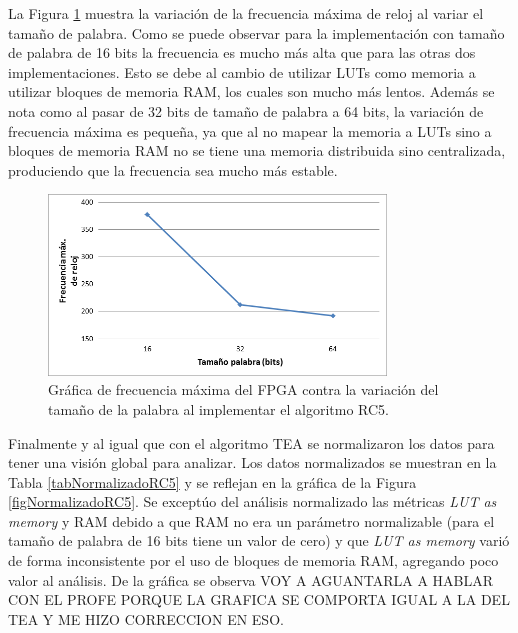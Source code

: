 La Figura \ref{figFrecuenciasRC5} muestra la variación de la frecuencia máxima de reloj al variar el tamaño de palabra. Como se puede observar para la implementación con tamaño de palabra de 16 bits la frecuencia es mucho más alta que para las otras dos implementaciones. Esto se debe al cambio de utilizar LUTs como memoria a utilizar bloques de memoria RAM, los cuales son mucho más lentos. Además se nota como al pasar de 32 bits de tamaño de palabra a 64 bits, la variación de frecuencia máxima es pequeña, ya que al no mapear la memoria a LUTs sino a bloques de memoria RAM no se tiene una memoria distribuida sino centralizada, produciendo que la frecuencia sea mucho más estable.
\begin{figure}[H]
	\centering
	\includegraphics[width=0.8\textwidth]{./images/figFrecuenciasRC5}
	\caption{Gráfica de frecuencia máxima del FPGA contra la variación del tamaño de la palabra al implementar el algoritmo RC5.}
	\label{figFrecuenciasRC5}
\end{figure}

Finalmente y al igual que con el algoritmo TEA se normalizaron los datos para tener una visión global para analizar. Los datos normalizados se muestran en la Tabla \ref{tabNormalizadoRC5} y se reflejan en la gráfica de la Figura \ref{figNormalizadoRC5}. Se exceptúo del análisis normalizado las métricas \textit{LUT as memory} y RAM debido a que RAM no era un parámetro normalizable (para el tamaño de palabra de 16 bits tiene un valor de cero) y que \textit{LUT as memory} varió de forma inconsistente por el uso de bloques de memoria RAM, agregando poco valor al análisis. De la gráfica se observa VOY A AGUANTARLA A HABLAR CON EL PROFE PORQUE LA GRAFICA SE COMPORTA IGUAL A LA DEL TEA Y ME HIZO CORRECCION EN ESO.

